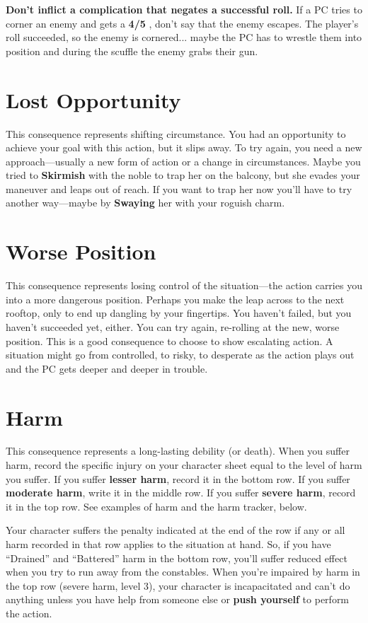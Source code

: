 \documentclass[11pt,oneside]{book}
\newcommand{\gameterm}[1]{\textbf{#1}}
\begin{document}
\textbf{Don’t inflict a complication that negates a successful roll.} If a PC tries to corner an enemy and gets a \gameterm{4/5} , don’t say that the enemy escapes. The player’s roll succeeded, so the enemy is cornered... maybe the PC has to wrestle them into position and during the scuffle the enemy grabs their gun.

\section{Lost Opportunity}

This consequence represents shifting circumstance. You had an opportunity to achieve your goal with this action, but it slips away. To try again, you need a new approach---usually a new form of action or a change in circumstances. Maybe you tried to \gameterm{Skirmish}  with the noble to trap her on the balcony, but she evades your maneuver and leaps out of reach. If you want to trap her now you’ll have to try another way---maybe by \gameterm{Swaying}  her with your roguish charm.

\section{Worse Position}

This consequence represents losing control of the situation---the action carries you into a more dangerous position. Perhaps you make the leap across to the next rooftop, only to end up dangling by your fingertips. You haven’t failed, but you haven’t succeeded yet, either. You can try again, re-rolling at the new, worse position. This is a good consequence to choose to show escalating action. A situation might go from controlled, to risky, to desperate as the action plays out and the PC gets deeper and deeper in trouble.

\section{Harm}

This consequence represents a long-lasting debility (or death). When you suffer harm, record the specific injury on your character sheet equal to the level of harm you suffer. If you suffer\textbf{ lesser harm}, record it in the bottom row. If you suffer \textbf{moderate harm}, write it in the middle row. If you suffer \textbf{severe harm}, record it in the top row. See examples of harm and the harm tracker, below.

Your character suffers the penalty indicated at the end of the row if any or all harm recorded in that row applies to the situation at hand. So, if you have “Drained” and “Battered” harm in the bottom row, you’ll suffer reduced effect when you try to run away from the constables. When you’re impaired by harm in the top row (severe harm, level 3), your character is incapacitated and can’t do anything unless you have help from someone else or \textbf{push yourself} to perform the action.
\end{document}
